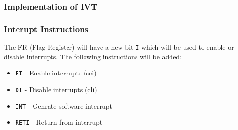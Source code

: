 \begin{frame}
    \frametitle{Implementation of IVT}
    \begin{table}[]
    \end{table}
    \note{
    }

\end{frame}

\begin{frame}
    \frametitle{Interupt Instructions}
    The FR (Flag Register) will have a new bit \texttt{I} which will be used to enable or disable interrupts.
    The following instructions will be added:
    \begin{itemize}
        \item \texttt{EI} - Enable interrupts (sei)
        \item \texttt{DI} - Disable interrupts (cli)
        \item \texttt{INT} - Genrate software interrupt
        \item \texttt{RETI} - Return from interrupt
    \end{itemize}
\end{frame}

